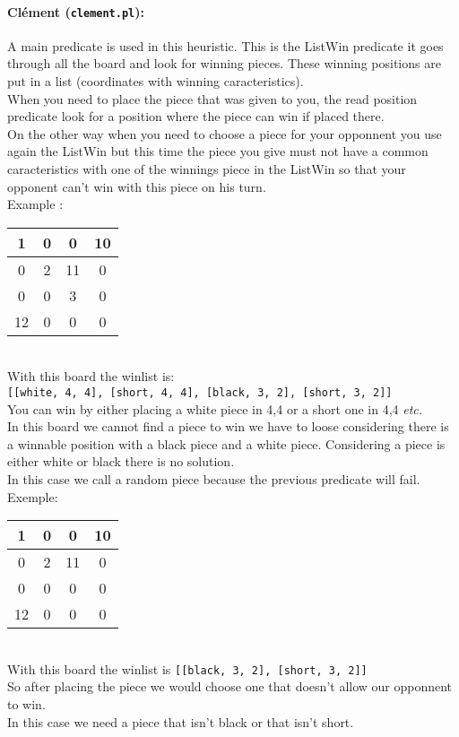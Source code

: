 \documentclass[a4paper,11pt]{article}
\newcommand{\tw}[1]{\texttt{#1}}
\newcommand{\board}[4]{
	\begin{tabular}{|c|c|c|c|} \hline
		#1 \\\hline
		#2 \\\hline
		#3 \\\hline
		#4 \\\hline
	\end{tabular}
}
\begin{document}
		\paragraph{Clément (\tw{clement.pl}):} A main predicate is used in this heuristic. This is the ListWin predicate it goes through all the board and look for winning pieces. These winning positions are put in a list (coordinates with winning caracteristics). \\
		When you need to place the piece that was given to you, the read position predicate look for a position where the piece can win if placed there. \\
		On the other way when you need to choose a piece for your opponnent you use again the ListWin but this time the piece you give must not have a common caracteristics with one of the winnings piece in the ListWin so that your opponent can't win with this piece on his turn. \\
		Example :
		\board{1 & 0 & 0 & 10}{0 & 2 & 11 & 0}{0 & 0 & 3 & 0}{12 & 0 & 0 & 0} \\
		With this board the winlist is:\\
		\tw{[[white, 4, 4], [short, 4, 4], [black, 3, 2], [short, 3, 2]]} \\
		You can win by either placing a white piece in 4,4 or a short one in 4,4 \textit{etc.}\\
		In this board we cannot find a piece to win we have to loose considering there is a winnable position with a black piece and a white piece. Considering a piece is either white or black there is no solution. \\
		In this case we call a random piece because the previous predicate will fail. \\
		Exemple: \board{1 & 0 & 0 & 10}{0 & 2 & 11 & 0}{0 & 0 & 0 & 0}{12 & 0 & 0 & 0} \\
		With this board the winlist is \tw{[[black, 3, 2], [short, 3, 2]]} \\
		So after placing the piece we would choose one that doesn't allow our opponnent to win. \\
		In this case we need a piece that isn't black or that isn't short.
		
\end{document}

